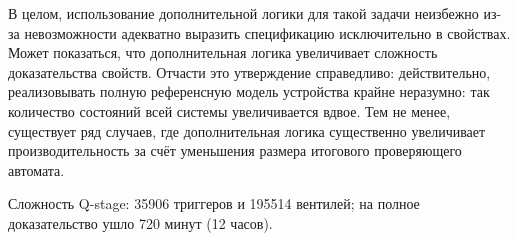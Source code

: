 В целом, использование дополнительной логики для такой задачи неизбежно из-за невозможности адекватно выразить спецификацию исключительно в свойствах. Может показаться, что дополнительная логика увеличивает сложность доказательства свойств. Отчасти это утверждение справедливо: действительно, реализовывать полную референсную модель устройства крайне неразумно: так количество состояний всей системы увеличивается вдвое. Тем не менее, существует ряд случаев, где дополнительная логика существенно увеличивает производительность за счёт уменьшения размера итогового проверяющего автомата. 

Сложность Q-stage: 35906 триггеров и 195514 вентилей; на полное доказательство ушло 720 минут (12 часов). 







